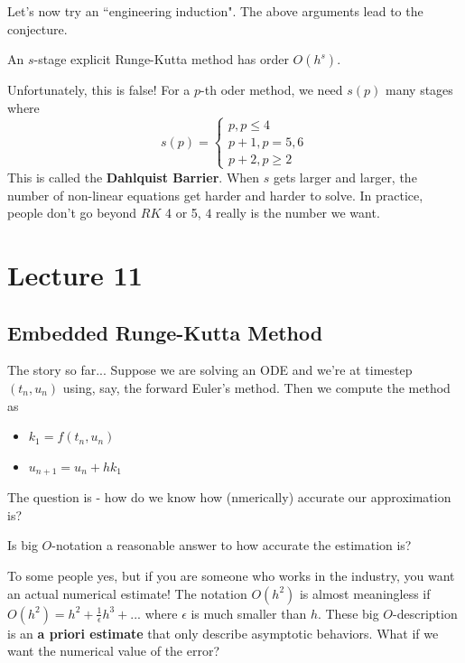 \documentclass{article}
\begin{document}
\begin{remark}
Let's now try an ``engineering induction". The above arguments lead to the conjecture.
\begin{conjecture}
    An $s$-stage explicit Runge-Kutta method has order $O(h^s)$.
\end{conjecture}
Unfortunately, this is false! For a $p$-th oder method, we need $s(p)$ many stages where 
\[s(p) = \begin{cases}
    p, p \leq 4\\
    p + 1, p = 5, 6\\
    p + 2, p \geq 2
\end{cases}\]
This is called the \textbf{Dahlquist Barrier}. When $s$ gets larger and larger, the number of non-linear equations get harder and harder to solve. In practice, people don't go beyond $RK$ 4 or 5, $4$ really is the number we want.     
\end{remark}

\newpage
\section{Lecture 11}

\subsection{Embedded Runge-Kutta Method}

The story so far... Suppose we are solving an ODE and we're at timestep $(t_n, u_n)$ using, say, the forward Euler's method. Then we compute the method as
\begin{itemize}
    \item $k_1 = f(t_n, u_n)$
    \item $u_{n+1} = u_n + h k_1$
\end{itemize}
The question is - how do we know how (nmerically) accurate our approximation is?

\begin{question}
    Is big $O$-notation a reasonable answer to how accurate the estimation is?
\end{question}

To some people yes, but if you are someone who works in the industry, you want an actual numerical estimate! The notation $O(h^2)$ is almost meaningless if $O(h^2) = h^2 + \frac{1}{\epsilon} h^3 + ... $ where $\epsilon$ is much smaller than $h$. These big $O$-description is an \textbf{a priori estimate} that only describe asymptotic behaviors. What if we want the numerical value of the error?\\
\end{document}
